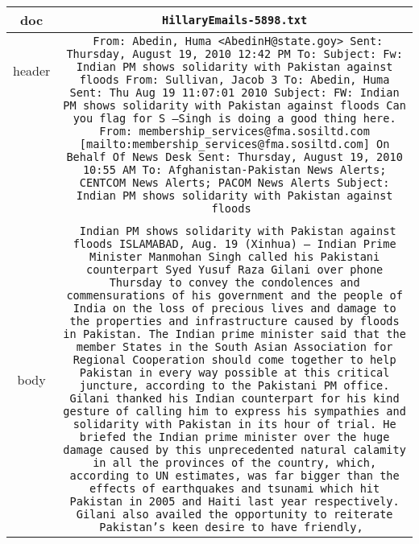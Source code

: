 \begin{table*}[t]
	\begin{tabular*}{\textwidth}{c|c}
		\toprule
		doc&\texttt{HillaryEmails-5898.txt} \\
		\midrule
		header&\multirow{8}{.9\textwidth}{\texttt{
		From: Abedin, Huma <AbedinH@state.goy>
		Sent: Thursday, August 19, 2010 12:42 PM
		To:
		Subject: Fw: Indian PM shows solidarity with Pakistan against floods
		From: Sullivan, Jacob 3
		To: Abedin, Huma
		Sent: Thu Aug 19 11:07:01 2010
		Subject: FW: Indian PM shows solidarity with Pakistan against floods
		Can you flag for S —Singh is doing a good thing here.
		From: membership\_services@fma.sosiltd.com [mailto:membership\_services@fma.sosiltd.com] On Behalf Of News Desk
		Sent: Thursday, August 19, 2010 10:55 AM
		To: Afghanistan-Pakistan News Alerts; CENTCOM News Alerts; PACOM News Alerts
		Subject: Indian PM shows solidarity with Pakistan against floods
	}} \\
	&    \\
	&    \\
	&    \\
	&    \\
	&    \\
	&    \\
	&    \\
	&    \\
     \midrule 
        body&\multirow{20}{.9\textwidth}{\texttt{
		Indian PM shows solidarity with Pakistan against floods
		ISLAMABAD, Aug. 19 (Xinhua) -- Indian Prime Minister Manmohan Singh called his Pakistani
		counterpart Syed Yusuf Raza Gilani over phone Thursday to convey the condolences and
		commensurations of his government and the people of India on the loss of precious lives
		and damage to the properties and infrastructure caused by floods in Pakistan.
		The Indian prime minister said that the member States in the South Asian Association for
		Regional Cooperation should come together to help Pakistan in every way possible at this
		critical juncture, according to the Pakistani PM office.
		Gilani thanked his Indian counterpart for his kind gesture of calling him to express his
		sympathies and solidarity with Pakistan in its hour of trial.
		He briefed the Indian prime minister over the huge damage caused by this unprecedented
		natural calamity in all the provinces of the country, which, according to UN estimates,
		was far bigger than the effects of earthquakes and tsunami which hit Pakistan in 2005 and
		Haiti last year respectively.
		Gilani also availed the opportunity to reiterate Pakistan's keen desire to have friendly,
}}
\end{tabular*}
\end{table*}
